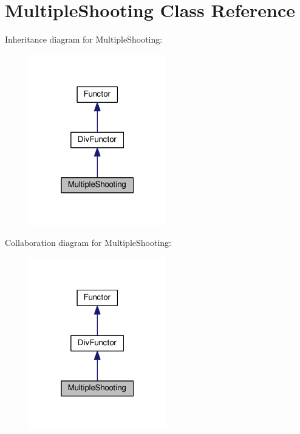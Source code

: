 \hypertarget{classMultipleShooting}{}\section{Multiple\+Shooting Class Reference}
\label{classMultipleShooting}


Inheritance diagram for Multiple\+Shooting\+:\nopagebreak
\begin{figure}[H]
\begin{center}
\leavevmode
\includegraphics[width=169pt]{classMultipleShooting__inherit__graph}
\end{center}
\end{figure}


Collaboration diagram for Multiple\+Shooting\+:\nopagebreak
\begin{figure}[H]
\begin{center}
\leavevmode
\includegraphics[width=169pt]{classMultipleShooting__coll__graph}
\end{center}
\end{figure}
